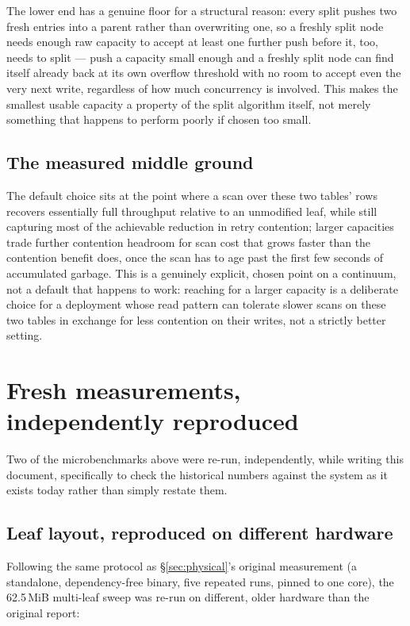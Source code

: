 \documentclass[11pt]{article}
\begin{document}
The lower end has a genuine floor for a structural reason: every split pushes two
fresh entries into a parent rather than overwriting one, so a freshly split node
needs enough raw capacity to accept at least one further push before it, too, needs
to split --- push a capacity small enough and a freshly split node can find itself
already back at its own overflow threshold with no room to accept even the very
next write, regardless of how much concurrency is involved. This makes the smallest
usable capacity a property of the split algorithm itself, not merely something that
happens to perform poorly if chosen too small.

\subsection{The measured middle ground}

The default choice sits at the point where a scan over these two tables' rows
recovers essentially full throughput relative to an unmodified leaf, while still
capturing most of the achievable reduction in retry contention; larger capacities
trade further contention headroom for scan cost that grows faster than the
contention benefit does, once the scan has to age past the first few seconds of
accumulated garbage. This is a genuinely explicit, chosen point on a continuum, not
a default that happens to work: reaching for a larger capacity is a deliberate
choice for a deployment whose read pattern can tolerate slower scans on these two
tables in exchange for less contention on their writes, not a strictly better
setting.

\section{Fresh measurements, independently reproduced}
\label{sec:fresh}

Two of the microbenchmarks above were re-run, independently, while writing this
document, specifically to check the historical numbers against the system as it
exists today rather than simply restate them.

\subsection{Leaf layout, reproduced on different hardware}

Following the same protocol as \S\ref{sec:physical}'s original measurement (a
standalone, dependency-free binary, five repeated runs, pinned to one core), the
62.5\,MiB multi-leaf sweep was re-run on different, older hardware than the original
report:
\end{document}
